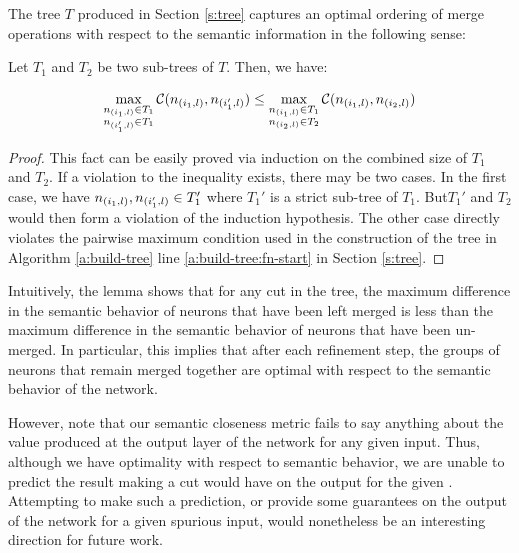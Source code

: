 The tree $T$ produced in Section \ref{s:tree} captures an optimal ordering of
merge operations with respect to the semantic information in the following
sense:

\begin{lemma}
Let $T_1$ and $T_2$ be two sub-trees of $T$. Then, we have:

\begin{equation*}
\begin{aligned}
    \max_{ \substack{ n_{(i_1,l)} \in T_1 \\ n_{(i_1',l)} \in T_1 }} 
    \mathcal{C}( n_{(i_1,l)}, n_{(i_1',l)} ) \leq
    \max_{ \substack{ n_{(i_1,l)} \in T_1 \\ n_{(i_2,l)} \in T_2 }} 
    \mathcal{C}( n_{(i_1,l)}, n_{(i_2,l)} )
\end{aligned}
\end{equation*}

\end{lemma}
\begin{proof}
This fact can be easily proved via induction on the combined size of $T_1$ and
$T_2$. If a violation to the inequality exists, there may be two cases. In the
first case, we have $n_{(i_1,l)}, n_{(i_1',l)} \in T_1'$ where $T_1'$ is a
strict sub-tree of $T_1$. But$T_1'$ and $T_2$ would then form a violation of the
induction hypothesis. The other case directly violates the pairwise maximum
condition  used in the construction of the
tree in Algorithm \ref{a:build-tree} line \ref{a:build-tree:fn-start}
in Section \ref{s:tree}.
\end{proof}

Intuitively, the lemma shows that for any cut in the tree, the
maximum difference in the semantic behavior of neurons that have been left
merged is less than the maximum difference in the semantic behavior of neurons
that have been un-merged. In particular, this implies that after each refinement
step, the groups of neurons that remain merged together are optimal with respect
to the semantic behavior of the network.

However, note that our semantic closeness metric fails to say anything about the
value produced at the output layer of the network for any given input. Thus,
although we have optimality with respect to semantic behavior, we are unable to
predict the result making a cut would have on the output for the given \gencex.
Attempting to make such a prediction, or provide some guarantees on the output
of the network for a given spurious input, would nonetheless be an interesting
direction for future work.

